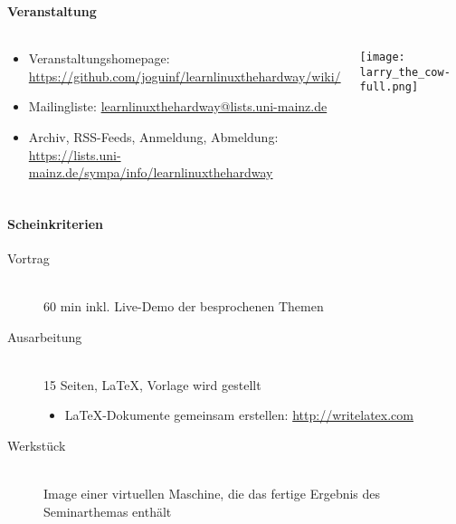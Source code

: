 \documentclass[utf8]{beamer}
\begin{document}
\begin{frame}
  \frametitle{\insertsectionhead}
  \framesubtitle{Veranstaltung}

  \begin{columns}
      \begin{block}{}
        \begin{itemize}
          \item Veranstaltungshomepage:
            \url{https://github.com/joguinf/learnlinuxthehardway/wiki/}
          \item Mailingliste: 
            \url{learnlinuxthehardway@lists.uni-mainz.de}
          \item Archiv, RSS-Feeds, Anmeldung, Abmeldung:
            \url{https://lists.uni-mainz.de/sympa/info/learnlinuxthehardway}
        \end{itemize}
      \end{block}
      \hfill
      \texttt{[image: larry\_the\_cow-full.png]}
  \end{columns}
\end{frame}

\begin{frame}
  \frametitle{\insertsectionhead}
  \framesubtitle{Scheinkriterien}

  \begin{block}{}
    \begin{description}
      \item[Vortrag] \hfill \\
        60 min inkl. Live-Demo der besprochenen Themen
      \item[Ausarbeitung] \hfill \\
        15 Seiten, \LaTeX{}, Vorlage wird gestellt
        \begin{itemize}
          \item \LaTeX{}-Dokumente gemeinsam erstellen:
            \url{http://writelatex.com}
        \end{itemize}
      \item[Werkstück] \hfill \\
        Image einer virtuellen Maschine, die das fertige Ergebnis des Seminarthemas enthält
    \end{description}
  \end{block}
\end{frame}
\end{document}
